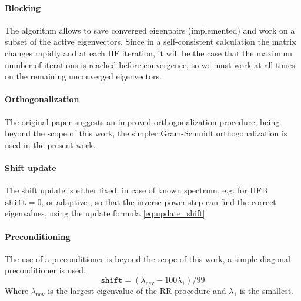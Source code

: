 \paragraph{Blocking} The algorithm allows to save converged eigenpairs (implemented) and work on a subset of the active eigenvectors. Since in a self-consistent calculation the matrix changes rapidly and at each HF iteration, it will be the case that the maximum number of iterations is reached before convergence, so we must work at all times on the remaining unconverged eigenvectors.
\paragraph{Orthogonalization} The original paper \cite{GCG1} suggests an improved orthogonalization procedure; being beyond the scope of this work, the simpler Gram-Schmidt \cite{GM} orthogonalization is used in the present work.
\paragraph{Shift update} The shift update is either fixed, in case of known spectrum, e.g. for HFB $\texttt{shift} = 0$, or adaptive \cite{GCG1}, so that the inverse power step can find the correct eigenvalues, using the update formula \eqref{eq:update_shift}
\paragraph{Preconditioning} The use of a preconditioner is beyond the scope of this work, a simple diagonal preconditioner is used.
\begin{equation}
    \label{eq:update_shift}
    \texttt{shift}=(\lambda_\text{nev} - 100\lambda_1)/99
\end{equation}
Where $\lambda_\text{nev}$ is the largest eigenvalue of the RR procedure and $\lambda_1$ is the smallest.
